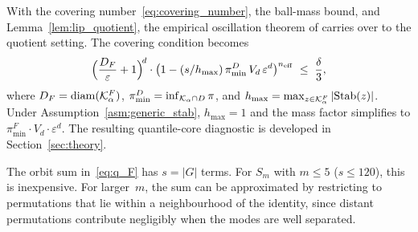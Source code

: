 \noindent
With the covering number~\eqref{eq:covering_number}, the ball-mass
bound, and Lemma~\ref{lem:lip_quotient}, the empirical
oscillation theorem of \citet[Theorem~5.1]{LCNF} carries over to the
quotient setting.  The covering condition becomes
\begin{equation}\label{eq:covering_cond_F}
  \Bigl(\frac{D_F}{\varepsilon} + 1\Bigr)^{\!d}
  \cdot
  \bigl(1 - (s/h_{\max})\,\pi_{\min}^D\, V_d\, \varepsilon^d\bigr)^{n_{\mathrm{eff}}}
  \;\leq\; \frac{\delta}{3},
\end{equation}
where $D_F = \mathrm{diam}(\mathcal{K}_\alpha^F)$,
$\pi_{\min}^D = \inf_{\mathcal{K}_\alpha \cap D}\pi$, and
$h_{\max} = \max_{z \in \mathcal{K}_\alpha^F}|\mathrm{Stab}(z)|$.
Under Assumption~\ref{asm:generic_stab}, $h_{\max} = 1$ and the
mass factor simplifies to $\pi_{\min}^F \cdot V_d \cdot \varepsilon^d$.
The resulting quantile-core diagnostic is developed in
Section~\ref{sec:theory}.

\begin{remark}\label{rem:scalability}
  The orbit sum in~\eqref{eq:q_F} has $s = |G|$ terms.
  For $S_m$ with $m \leq 5$ ($s \leq 120$), this is inexpensive.
  For larger~$m$, the sum can be approximated by restricting to
  permutations that lie within a neighbourhood of the identity,
  since distant permutations contribute negligibly when the modes
  are well separated.
\end{remark}
